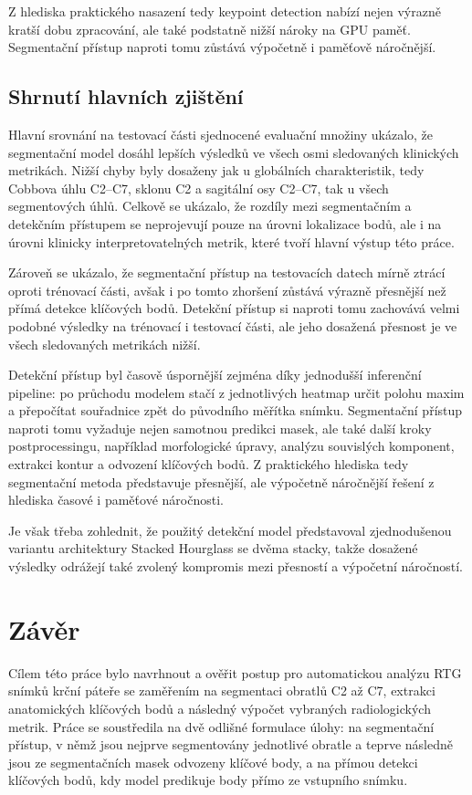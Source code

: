 \documentclass[male,czech,api_bc]{kitheses}
\begin{document}
Z hlediska praktického nasazení tedy keypoint detection nabízí nejen výrazně kratší dobu zpracování, ale také podstatně nižší nároky na GPU paměť. Segmentační přístup naproti tomu zůstává výpočetně i paměťově náročnější.

\section{Shrnutí hlavních zjištění}

Hlavní srovnání na testovací části sjednocené evaluační množiny ukázalo, že segmentační model dosáhl lepších výsledků ve všech osmi sledovaných klinických metrikách. Nižší chyby byly dosaženy jak u globálních charakteristik, tedy Cobbova úhlu C2--C7, sklonu C2 a sagitální osy C2--C7, tak u všech segmentových úhlů. Celkově se ukázalo, že rozdíly mezi segmentačním a detekčním přístupem se neprojevují pouze na úrovni lokalizace bodů, ale i na úrovni klinicky interpretovatelných metrik, které tvoří hlavní výstup této práce.

Zároveň se ukázalo, že segmentační přístup na testovacích datech mírně ztrácí oproti trénovací části, avšak i po tomto zhoršení zůstává výrazně přesnější než přímá detekce klíčových bodů. Detekční přístup si naproti tomu zachovává velmi podobné výsledky na trénovací i testovací části, ale jeho dosažená přesnost je ve všech sledovaných metrikách nižší.

Detekční přístup byl časově úspornější zejména díky jednodušší inferenční pipeline: po průchodu modelem stačí z jednotlivých heatmap určit polohu maxim a přepočítat souřadnice zpět do původního měřítka snímku. Segmentační přístup naproti tomu vyžaduje nejen samotnou predikci masek, ale také další kroky postprocessingu, například morfologické úpravy, analýzu souvislých komponent, extrakci kontur a odvození klíčových bodů. Z praktického hlediska tedy segmentační metoda představuje přesnější, ale výpočetně náročnější řešení z hlediska časové i paměťové náročnosti.

Je však třeba zohlednit, že použitý detekční model představoval zjednodušenou variantu architektury Stacked Hourglass se dvěma stacky, takže dosažené výsledky odrážejí také zvolený kompromis mezi přesností a výpočetní náročností.


\chapter{Závěr}

Cílem této práce bylo navrhnout a ověřit postup pro automatickou analýzu RTG snímků krční páteře se zaměřením na segmentaci obratlů C2 až C7, extrakci anatomických klíčových bodů a následný výpočet vybraných radiologických metrik. Práce se soustředila na dvě odlišné formulace úlohy: na segmentační přístup, v němž jsou nejprve segmentovány jednotlivé obratle a teprve následně jsou ze segmentačních masek odvozeny klíčové body, a na přímou detekci klíčových bodů, kdy model predikuje body přímo ze vstupního snímku.
\end{document}
